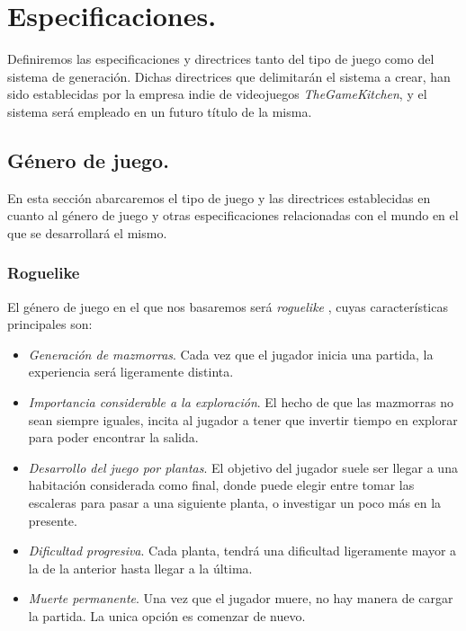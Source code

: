 \chapter{Especificaciones.}\label{cap:capitulo2}

Definiremos las especificaciones y directrices tanto del tipo de juego como del sistema de generación. Dichas directrices que delimitarán el sistema a crear, han sido establecidas por la empresa indie de videojuegos \emph{TheGameKitchen}, y el sistema será empleado en un futuro título de la misma.

\section{Género de juego.}

En esta sección abarcaremos el tipo de juego y las directrices establecidas en cuanto al género de juego y otras especificaciones relacionadas con el mundo en el que se desarrollará el mismo.

\subsection{Roguelike}

El género de juego en el que nos basaremos será \emph{roguelike} \cite{rlike}, cuyas características principales son:

\begin{itemize}
	\item \emph{Generación de mazmorras}. Cada vez que el jugador inicia una partida, la experiencia será ligeramente distinta.
	\item \emph{Importancia considerable a la exploración}. El hecho de que las mazmorras no sean siempre iguales, incita al jugador a tener que invertir tiempo en explorar para poder encontrar la salida.
	\item \emph{Desarrollo del juego por plantas}. El objetivo del jugador suele ser llegar a una habitación considerada como final, donde puede elegir entre tomar las escaleras para pasar a una siguiente planta, o investigar un poco más en la presente.
	\item \emph{Dificultad progresiva}. Cada planta, tendrá una dificultad ligeramente mayor a la de la anterior hasta llegar a la última.
	\item \emph{Muerte permanente}. Una vez que el jugador muere, no hay manera de cargar la partida. La unica opción es comenzar de nuevo.
\end{itemize}

